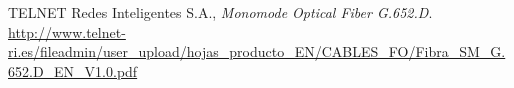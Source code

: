 
%
%
%
	
%

\begin{thebibliography}{9}

  TELNET Redes Inteligentes S.A.,
  \emph{Monomode Optical Fiber G.652.D}.
  \url{http://www.telnet-ri.es/fileadmin/user_upload/hojas_producto_EN/CABLES_FO/Fibra_SM_G.652.D_EN_V1.0.pdf}

\end{thebibliography}